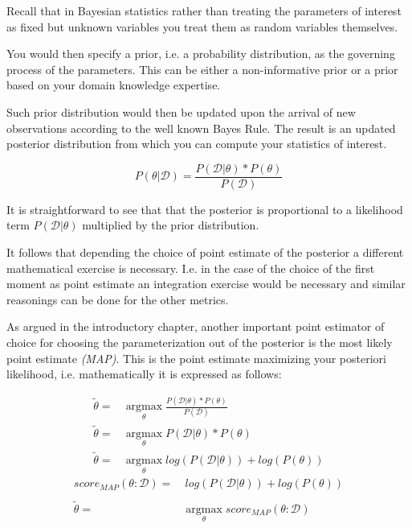 \documentclass[11pt]{article}
\begin{document}
\begin{article}
Recall that in Bayesian statistics rather than treating the
parameters of interest as fixed but unknown variables you treat
them as random variables themselves.

You would then specify a prior, i.e. a probability distribution, as
the governing process of the parameters. This can be either a
non-informative prior or a prior based on your domain knowledge
expertise.

Such prior distribution would then be updated upon the arrival of
new observations according to the well known Bayes Rule. The result
is an updated posterior distribution from which you can compute your
statistics of interest.


\begin{equation} \label{eq:bayes_formula}
P (\theta | \mathscr{D}) = \frac{P (\mathscr{D} | \theta) * P(\theta)}{P (\mathscr{D})} 
\end{equation}

It is straightforward to see that that the posterior is proportional
to a likelihood term \(P (\mathscr{D} | \theta)\) multiplied by the
prior distribution.

It follows that depending the choice of point estimate of the
posterior a different mathematical exercise is necessary. I.e. in
the case of the choice of the first moment as point estimate an
integration exercise would be necessary and similar reasonings can
be done for the other metrics.

As argued in the introductory chapter, another important point
estimator of choice for choosing the parameterization out of the
posterior is the most likely point estimate \emph{(MAP)}. This is the
point estimate maximizing your posteriori likelihood,
i.e. mathematically it is expressed as follows:

\begin{align} \label{eq:bayes_map}
\tilde{\theta} =& \operatorname*{argmax}_{\theta} \frac{P (\mathscr{D} | \theta) * P(\theta)}{P (\mathscr{D})} \nonumber\\
\tilde{\theta} =& \operatorname*{argmax}_{\theta} P (\mathscr{D} | \theta) * P(\theta)\\ 
\tilde{\theta} =& \operatorname*{argmax}_{\theta} log (P (\mathscr{D} | \theta)) + log (P(\theta)) \nonumber
\end{align}
\begin{align} \label{eq:bayes_map2}
score_{MAP} (\theta : \mathscr{D}) =& \ log (P (\mathscr{D} | \theta)) + log (P(\theta)) \nonumber\\
\nonumber\\
\tilde{\theta} =& \operatorname*{argmax}_{\theta} score_{MAP}(\theta : \mathscr{D}) 
\end{align}


\end{article}
\end{document}
